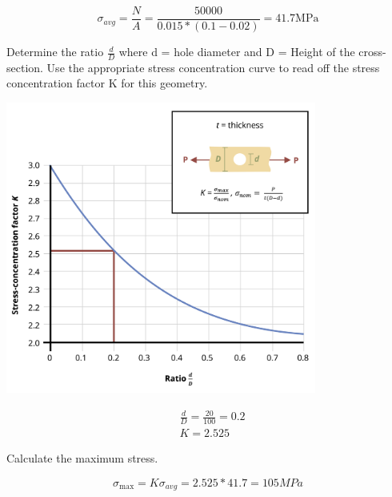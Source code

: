 \documentclass[
  letterpaper,
  DIV=11,
  numbers=noendperiod]{scrreprt}
\begin{document}
\begin{tcolorbox}
\begin{tcolorbox}
\[
\sigma_{a v g}=\frac{N}{A}=\frac{50000}{0.015 *(0.1-0.02)}=41.7 \mathrm{MPa}
\]

Determine the ratio \(\frac{d}{D}\) where d = hole diameter and D =
Height of the cross-section. Use the appropriate stress concentration
curve to read off the stress concentration factor K for this geometry.

\begin{center}
\includegraphics[width=4.02083in,height=\textheight]{images/PNGs/Example 5.1 part 3.png}
\end{center}

\[
\begin{aligned}
&\frac{d}{D}=\frac{20}{100}=0.2\\
&K=2.525
\end{aligned}
\]

Calculate the maximum stress.

\[
\sigma_{\max }=K \sigma_{a v g}=2.525 * 41.7=105 M P a
\]

\end{tcolorbox}

\end{tcolorbox}
\end{document}
